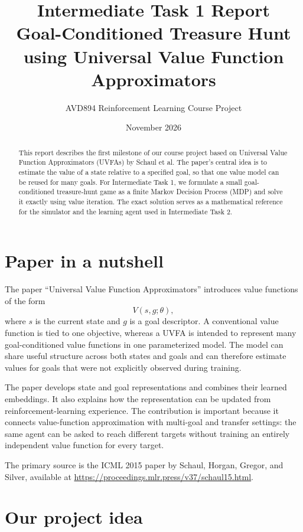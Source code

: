 \documentclass[11pt,a4paper]{article}
\title{Intermediate Task 1 Report\\\large Goal-Conditioned Treasure Hunt using Universal Value Function Approximators}
\author{AVD894 Reinforcement Learning Course Project}
\date{November 2026}
\begin{document}
\maketitle

\begin{abstract}
This report describes the first milestone of our course project based on
Universal Value Function Approximators (UVFAs) by Schaul et al. The paper's
central idea is to estimate the value of a state relative to a specified goal,
so that one value model can be reused for many goals. For Intermediate Task 1,
we formulate a small goal-conditioned treasure-hunt game as a finite Markov
Decision Process (MDP) and solve it exactly using value iteration. The exact
solution serves as a mathematical reference for the simulator and the learning
agent used in Intermediate Task 2.
\end{abstract}

\section{Paper in a nutshell}

The paper ``Universal Value Function Approximators'' introduces value functions
of the form
\[
    V(s,g;\theta),
\]
where $s$ is the current state and $g$ is a goal descriptor. A conventional
value function is tied to one objective, whereas a UVFA is intended to represent
many goal-conditioned value functions in one parameterized model. The model can
share useful structure across both states and goals and can therefore estimate
values for goals that were not explicitly observed during training.

The paper develops state and goal representations and combines their learned
embeddings. It also explains how the representation can be updated from
reinforcement-learning experience. The contribution is important because it
connects value-function approximation with multi-goal and transfer settings:
the same agent can be asked to reach different targets without training an
entirely independent value function for every target.

The primary source is the ICML 2015 paper by Schaul, Horgan, Gregor, and Silver,
available at \url{https://proceedings.mlr.press/v37/schaul15.html}.

\section{Our project idea}
\end{document}
